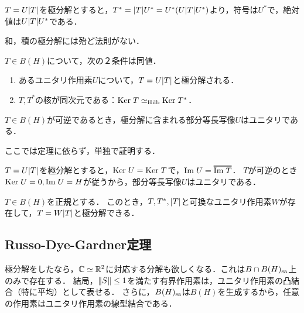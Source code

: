 \documentclass[uplatex,dvipdfmx]{jsreport}
\begin{document}
\begin{corollary}[随伴作用素の極分解]
    $T=U\lvert T\rvert$を極分解とすると，$T^*=\lvert T\rvert U^*=U^*(U\lvert T\rvert U^*)$より，符号は$U^*$で，絶対値は$U\lvert T\rvert U^*$である．
\end{corollary}
\begin{remark}
    和，積の極分解には殆ど法則がない．
\end{remark}

\begin{theorem}
    $T\in B(H)$について，次の２条件は同値．
    \begin{enumerate}
        \item あるユニタリ作用素$U$について，$T=U\lvert T\rvert$と極分解される．
        \item $T,T^*$の核が同次元である：$\mathrm{Ker}\; T\simeq_{\mathrm{Hilb}}\mathrm{Ker}\; T^*$．
    \end{enumerate}
\end{theorem}

\begin{corollary}\label{cor-polar-decomposition-of-invertible-operators}
    $T\in B(H)$が可逆であるとき，極分解に含まれる部分等長写像$U$はユニタリである．
\end{corollary}
\begin{Proof}
    ここでは定理に依らず，単独で証明する．

    $T=U\lvert T\rvert$を極分解とすると，$\mathrm{Ker}\; U=\mathrm{Ker}\; T$で，$\Im U=\oo{\Im T}$．
    $T$が可逆のとき$\mathrm{Ker}\; U=0,\mathrm{Im}\; U=H$が従うから，部分等長写像$U$はユニタリである．
\end{Proof}

\begin{corollary}
    $T\in B(H)$を正規とする．
    このとき，$T,T^*,\lvert T\rvert$と可換なユニタリ作用素$W$が存在して，$T=W\lvert T\rvert$と極分解できる．
\end{corollary}

\subsection{Russo-Dye-Gardner定理}

\begin{tcolorbox}[colframe=ForestGreen, colback=ForestGreen!10!white,breakable,colbacktitle=ForestGreen!40!white,coltitle=black,fonttitle=\bfseries\sffamily,
title=ユニタリ作用素への分解]
    極分解をしたなら，$\mathbb{C}\simeq\mathbb{R}^2$に対応する分解も欲しくなる．これは$B\cap B(H)_{\mathrm{sa}}$上のみで存在する．
    結局，$\|S\|\le 1$を満たす有界作用素は，ユニタリ作用素の凸結合（特に平均）として表せる．
    さらに，$B(H)_{\mathrm{sa}}$は$B(H)$を生成するから，任意の作用素はユニタリ作用素の線型結合である．
\end{tcolorbox}
\end{document}
